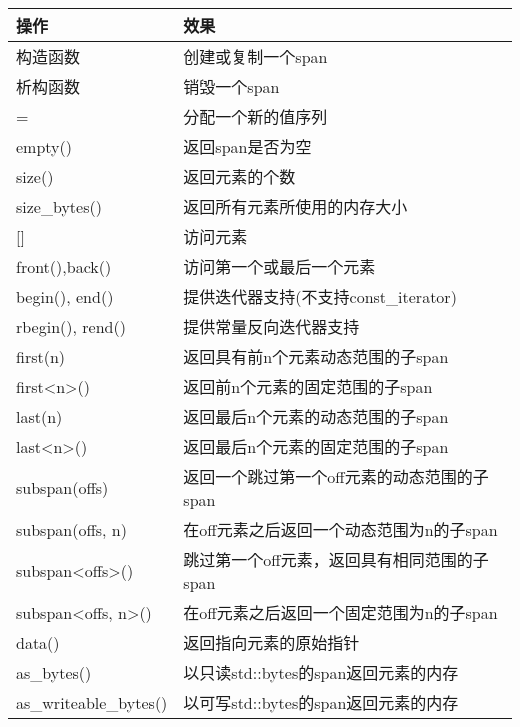 \begin{longtable}[c]{|l|l|}
\hline
\textbf{操作} & \textbf{效果}                                                      \\ \hline
\endfirsthead
%
\endhead
%
构造函数       & 创建或复制一个span                                             \\ \hline
析构函数         & 销毁一个span                                                      \\ \hline
=                  & 分配一个新的值序列                                    \\ \hline
empty()            & 返回span是否为空                                    \\ \hline
size()             & 返回元素的个数                                       \\ \hline
size\_bytes()      & 返回所有元素所使用的内存大小                     \\ \hline
{[}{]}             & 访问元素                                                  \\ \hline
front(),back()     & 访问第一个或最后一个元素                                   \\ \hline
begin(), end()     & 提供迭代器支持(不支持const\_iterator)               \\ \hline
rbegin(), rend()   & 提供常量反向迭代器支持                           \\ \hline
first(n)           & 返回具有前n个元素动态范围的子span       \\ \hline
first\textless{}n\textgreater{}()         & 返回前n个元素的固定范围的子span            \\ \hline
last(n)            & 返回最后n个元素的动态范围的子span        \\ \hline
last\textless{}n\textgreater{}()          & 返回最后n个元素的固定范围的子span             \\ \hline
subspan(offs)                             & 返回一个跳过第一个off元素的动态范围的子span \\ \hline
subspan(offs, n)   & 在off元素之后返回一个动态范围为n的子span      \\ \hline
subspan\textless{}offs\textgreater{}()    & 跳过第一个off元素，返回具有相同范围的子span    \\ \hline
subspan\textless{}offs, n\textgreater{}() & 在off元素之后返回一个固定范围为n的子span           \\ \hline
data()             & 返回指向元素的原始指针                                \\ \hline
as\_bytes()        & 以只读std::bytes的span返回元素的内存 \\ \hline
as\_writeable\_bytes()                    & 以可写std::bytes的span返回元素的内存     \\ \hline
\end{longtable}

